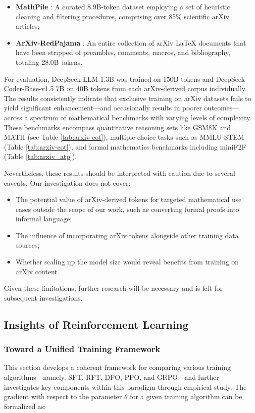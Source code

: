 \begin{itemize}[topsep=0pt]
\begin{itemize}[topsep=0pt]
    \item \textbf{MathPile} \citep{mathpile}: A curated 8.9B-token dataset employing a set of heuristic cleaning and filtering procedures, comprising over 85\% scientific arXiv articles;
    \item \textbf{ArXiv-RedPajama} \citep{redpajama}: An entire collection of arXiv LaTeX documents that have been stripped of preambles, comments, macros, and bibliography, totaling 28.0B tokens.
\end{itemize}

For evaluation, DeepSeek-LLM 1.3B was trained on 150B tokens and DeepSeek-Coder-Base-v1.5 7B on 40B tokens from each arXiv-derived corpus individually. The results consistently indicate that exclusive training on arXiv datasets fails to yield significant enhancement—and occasionally results in poorer outcomes—across a spectrum of mathematical benchmarks with varying levels of complexity. These benchmarks encompass quantitative reasoning sets like GSM8K and MATH (see Table \ref{tab:arxiv-cot}), multiple-choice tasks such as MMLU-STEM (Table \ref{tab:arxiv-cot}), and formal mathematics benchmarks including miniF2F (Table \ref{tab:arxiv_atp}).

Nevertheless, these results should be interpreted with caution due to several caveats. Our investigation does not cover:

\begin{itemize}[topsep=0pt]
    \item The potential value of arXiv-derived tokens for targeted mathematical use cases outside the scope of our work, such as converting formal proofs into informal language;
    \item The influence of incorporating arXiv tokens alongside other training data sources;
    \item Whether scaling up the model size would reveal benefits from training on arXiv content.
\end{itemize}

Given these limitations, further research will be necessary and is left for subsequent investigations.

\subsection{Insights of Reinforcement Learning}
\subsubsection{Toward a Unified Training Framework} This section develops a coherent framework for comparing various training algorithms—namely, SFT, RFT, DPO, PPO, and GRPO—and further investigates key components within this paradigm through empirical study. The gradient with respect to the parameter $\theta$ for a given training algorithm can be formalized as:


\end{itemize}

